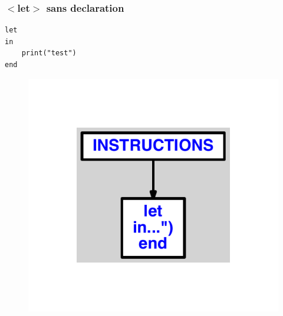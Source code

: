 \documentclass{article}
\begin{document}
\subsubsection{$ < $let$ > $ sans declaration}
\begin{lstlisting}
let
in
	print("test")
end
\end{lstlisting}
\newpage
\begin{figure}[H]
\centering
\includegraphics[max width=\textwidth]{ast/ast_267.pdf}
\end{figure}
\newpage
\end{document}
